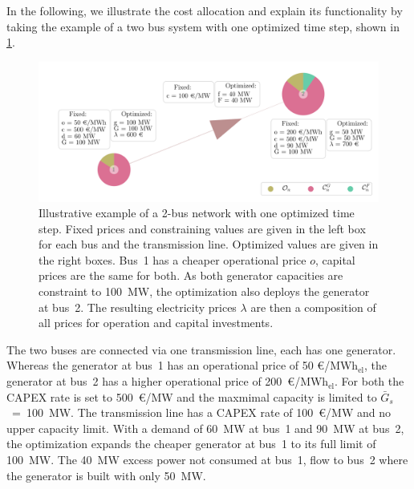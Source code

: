 \documentclass[11pt,twocolumn]{article}
\newcommand{\capacitygenerationupper}{\bar{G}_{s}}
\newcommand{\megawatthour}{MWh$_\text{el}$}
\begin{document}
In the following, we illustrate the cost allocation and explain its functionality by taking the example of a two bus system with one optimized time step, shown in \cref{fig:example_network}. \\
% 
% 
\begin{figure}[t]
\centering
\includegraphics[width=\linewidth]{example_network.png}
\caption{Illustrative example of a 2-bus network with one optimized time step. Fixed prices and constraining values are given in the left box for each bus and the transmission line. Optimized values are given in the right boxes. Bus~1 has a cheaper operational price $o$, capital prices are the same for both. As both generator capacities are constraint to 100~MW, the optimization also deploys the generator at bus~2. The resulting electricity prices $\lambda$ are then a composition of all prices for operation and capital investments. \vspace{-10pt}}
\label{fig:example_network}
\end{figure}
% 
% 
The two buses are connected via one transmission line, each has one generator. Whereas the generator at bus~1 has an operational price of 50 \euro/\megawatthour, the generator at bus~2 has a higher operational price of 200~\euro/\megawatthour. For both the CAPEX rate is set to 500~\euro/MW and the maxmimal capacity is limited to $\capacitygenerationupper$~=~100~MW. The transmission line has a CAPEX rate of 100~\euro/MW and no upper capacity limit. With a demand of 60~MW at bus~1 and 90~MW at bus~2, the optimization expands the cheaper generator at bus~1 to its full limit of 100~MW. The 40~MW excess power not consumed at bus~1, flow to bus~2 where the generator is built with only 50~MW.  
% 
\end{document}

